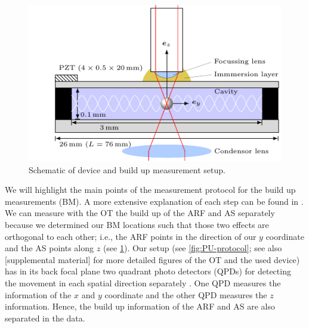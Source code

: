 \begin{figure}[tbp]
  \centering
  \includegraphics[width=120mm]{Plots/cache/PU-device.pdf}
  \caption{Schematic of device and build up measurement 
  setup.}\label{fig:PU-device}
\end{figure}

We will highlight the main points of the measurement protocol for the build up 
measurements (BM). A more extensive explanation of each step can be found in 
\citeauthor{Goering2021} \cite{Goering2021}. We can measure with the OT the 
build up of the ARF and AS separately because we determined our BM locations 
such that those two effects are orthogonal to each other; i.e., the ARF points 
in the direction of our $y$ coordinate and the AS points along $z$ (see 
\cref{fig:PU-device}). Our setup (see \cref{fig:PU-protocol}; see also [supplemental 
material] for more detailed figures of the OT and the used device) has in its 
back focal plane two quadrant photo detectors (QPDs) for detecting the movement 
in each spatial direction separately 
\cite{Lakaemper2015,Goering2021,Lamprecht2021,Lamprecht2016}. One QPD measures 
the information of the $x$ and $y$ coordinate and the other QPD measures the 
$z$ information. Hence, the build up information of the ARF and AS are also 
separated in the data.

